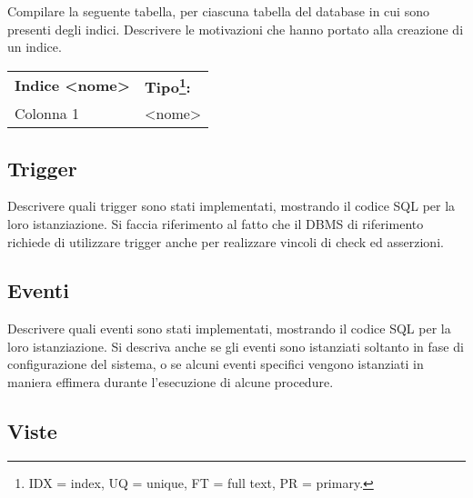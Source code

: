 \begin{templateblock}
    Compilare la seguente tabella, per ciascuna tabella del database in cui
    sono presenti degli indici.
    Descrivere le motivazioni che hanno portato alla creazione di un indice.
\end{templateblock}

\begin{tabularx}{\linewidth}{|X|X|}
    \hline
    \rowcolor{tgray}
    \multicolumn{2}{|X|}{\textbf{Tabella <nome>}}                                                             \\\hline
    \rowcolor{tgray}
    \textbf{Indice <nome>} & \textbf{Tipo\footnote{IDX = index, UQ = unique, FT = full text, PR = primary.}:} \\\hline
    Colonna 1              & <nome>                                                                           \\ \hline
\end{tabularx}

\subsection*{Trigger}

\begin{templateblock}
    Descrivere quali trigger sono stati implementati, mostrando il codice SQL
    per la loro istanziazione. Si faccia riferimento al fatto che il DBMS di
    riferimento richiede di utilizzare trigger anche per realizzare vincoli di
    check ed asserzioni.
\end{templateblock}

\subsection*{Eventi}

\begin{templateblock}
    Descrivere quali eventi sono stati implementati, mostrando il codice SQL
    per la loro istanziazione. Si descriva anche se gli eventi sono
    istanziati soltanto in fase di configurazione del sistema, o se alcuni
    eventi specifici vengono istanziati in maniera effimera durante
    l’esecuzione di alcune procedure.
\end{templateblock}

\subsection*{Viste}

